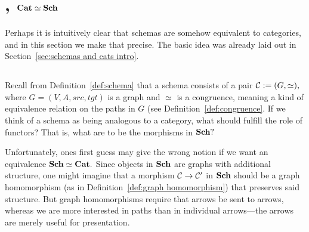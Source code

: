 \documentclass[../main/CT4S-EN-RU]{subfiles}
\begin{document}
\section{, \texorpdfstring{${\mathbf{Cat}}\simeq{\mathbf{Sch}}$}{Cat = Sch}}\label{sec:cat equiv sch}

\begin{blockENG}
Perhaps it is intuitively clear that schemas are somehow equivalent to categories, and in this section we make that precise. The basic idea was already laid out in Section~\ref{sec:schemas and cats intro}.
\end{blockENG}

\begin{blockRUS}
\end{blockRUS}


\subsection{}\label{sec:sch as category}

\begin{blockENG}
Recall from Definition~\ref{def:schema} that a schema consists of a pair $\mathcal{C}:=(G,\simeq),$ where $G=(V,A,src,tgt)$ is a graph and $\simeq$ is a congruence, meaning a kind of equivalence relation on the paths in $G$ (see Definition~\ref{def:congruence}. If we think of a schema as being analogous to a category, what should fulfill the role of functors? That is, what are to be the morphisms in ${\mathbf{Sch}}?$
\end{blockENG}

\begin{blockRUS}
\end{blockRUS}

\begin{blockENG}
Unfortunately, ones first guess may give the wrong notion if we want an equivalence ${\mathbf{Sch}}\simeq{\mathbf{Cat}}.$ Since objects in ${\mathbf{Sch}}$ are graphs with additional structure, one might imagine that a morphism $\mathcal{C}\rightarrow\mathcal{C}'$ in ${\mathbf{Sch}}$ should be a graph homomorphism (as in Definition~\ref{def:graph homomorphism}) that preserves said structure. But graph homomorphisms require that arrows be sent to arrows, whereas we are more interested in paths than in individual arrows—the arrows are merely useful for presentation. 
\end{blockENG}
\end{document}
